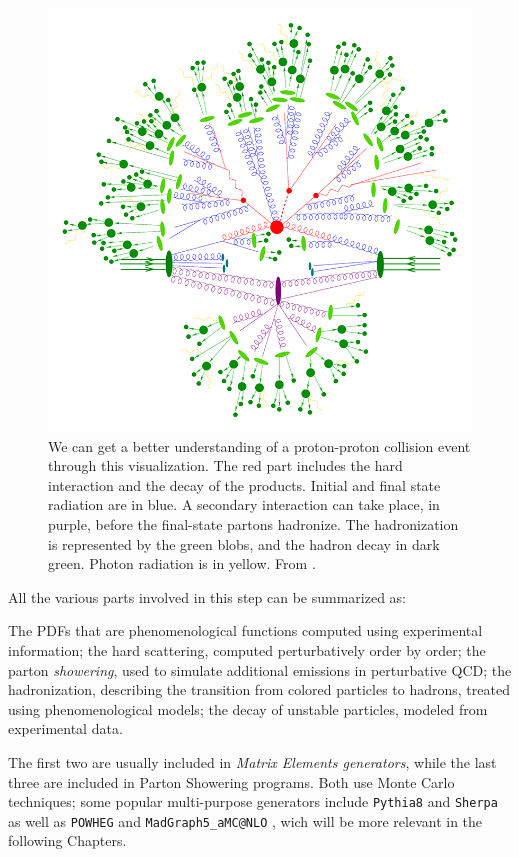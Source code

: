 \begin{figure}
    \centering
     \includegraphics[width=.65\linewidth]{gfx/ch2/event_800px.png}
    \caption[Event generation]{ We can get a better understanding of a proton-proton collision event through this visualization. The red part includes the hard interaction and the decay of the products. Initial and final state radiation are in blue. A secondary
interaction can take place, in purple, before the final-state partons hadronize. The hadronization is
represented by the green blobs, and the hadron decay in dark green. Photon radiation is in yellow. From \cite{evgen}.}
    \label{fig:evgen}
\end{figure}


All the various parts involved in this step can be summarized as:

\begin{outline}
    \1  The PDFs that are phenomenological functions computed using experimental information;
    \1  the hard scattering, computed perturbatively order by order;
    \1  the parton \emph{showering}, used to simulate additional emissions in perturbative QCD;
    \1   the hadronization, describing the transition from colored particles to hadrons, treated
        using phenomenological models;
    \1   the decay of unstable particles, modeled from experimental data.
    
\end{outline}

The first two are usually included in \emph{Matrix Elements generators}, while the last three are
included in Parton Showering programs. Both use Monte Carlo techniques; some popular multi-purpose generators include \texttt{Pythia8} \cite{Bierlich:2022pfr} and \texttt{Sherpa} \cite{Bothmann_2019} as well as \texttt{POWHEG} \cite{Nason_2004} and \texttt{MadGraph5\_aMC@NLO} \cite{powpow}, wich will be more relevant in the following Chapters.


